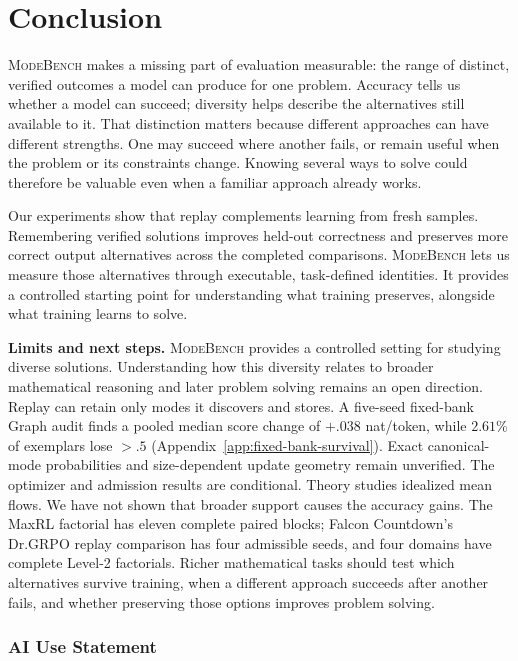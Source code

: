 \documentclass{article}
\newcommand{\1}{\mathbf 1}
\newcommand{\mb}{\textsc{ModeBench}}
\theoremstyle{remark}
\theoremstyle{definition}
\theoremstyle{plain}
\begin{document}
\section{Conclusion}
\label{sec:conclusion}
\label{sec:discussion}
\label{sec:limitations}

\mb{} makes a missing part of evaluation measurable: the range of distinct,
verified outcomes a model can produce for one problem. Accuracy tells us whether
a model can succeed; diversity helps describe the alternatives still available
to it. That distinction matters because different approaches can have different
strengths. One may succeed where another fails, or remain useful when the
problem or its constraints change. Knowing several ways to solve could therefore
be valuable even when a familiar approach already works.

Our experiments show that replay complements learning from fresh samples.
Remembering verified solutions improves held-out correctness and preserves
more correct output alternatives across the completed comparisons. \mb{}
lets us measure those alternatives through executable, task-defined identities.
It provides a controlled starting point for understanding what training
preserves, alongside what training learns to solve.

\textbf{Limits and next steps.} \mb{} provides a controlled setting for
studying diverse solutions. Understanding how this diversity relates to broader
mathematical reasoning and later problem solving remains an open direction. Replay can
retain only modes it discovers and stores. A five-seed fixed-bank Graph audit
finds a pooled median score change of $+.038$ nat/token, while $2.61\%$ of
exemplars lose $>.5$ (Appendix~\ref{app:fixed-bank-survival}). Exact canonical-mode
probabilities and size-dependent update geometry remain unverified. The optimizer and admission results are conditional. Theory studies idealized mean flows.
We have not shown that broader support
causes the accuracy gains. The MaxRL factorial has eleven complete paired
blocks; Falcon Countdown's Dr.GRPO replay comparison has four admissible seeds,
and four domains have complete Level-2 factorials. Richer mathematical tasks
should test which alternatives survive training, when a different approach
succeeds after another fails, and whether preserving those options improves
problem solving.

\clearpage
\subsubsection*{AI Use Statement}
\label{sec:ai-use}
\end{document}
